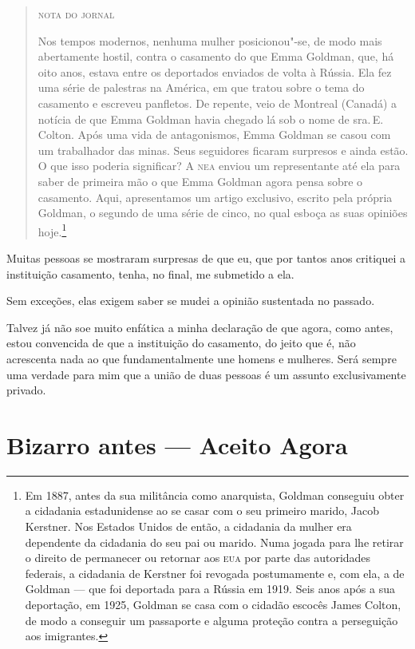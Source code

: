 \begin{quote}
\textsc{nota do jornal}

Nos tempos modernos, nenhuma mulher posicionou"-se, de
modo mais abertamente hostil, contra o casamento do que Emma Goldman,
que, há oito anos, estava entre os deportados enviados de volta à
Rússia. Ela fez uma série de palestras na América, em que tratou sobre o
tema do casamento e escreveu panfletos. De repente, veio de Montreal
(Canadá) a notícia de que Emma Goldman havia chegado lá sob o nome de
sra.\,E.\,Colton. Após uma vida de antagonismos, Emma Goldman se casou com
um trabalhador das minas. Seus seguidores ficaram surpresos e ainda
estão. O que isso poderia significar? A \textsc{nea} enviou um representante até
ela para saber de primeira mão o que Emma Goldman agora pensa sobre o
casamento. Aqui, apresentamos um artigo exclusivo, escrito pela própria
Goldman, o segundo de uma série de cinco, no qual esboça as suas opiniões
hoje.\footnote{Em 1887, antes da sua militância como anarquista, Goldman
  conseguiu obter a cidadania estadunidense ao se casar com o seu
  primeiro marido, Jacob Kerstner. Nos Estados Unidos de então, a
  cidadania da mulher era dependente da cidadania do seu pai ou marido.
  Numa jogada para lhe retirar o direito de permanecer ou retornar aos \textsc{eua}
  por parte das autoridades federais, a cidadania de Kerstner foi revogada
  postumamente e, com ela, a de Goldman --- que foi deportada para a
  Rússia em 1919. Seis anos após a sua deportação, em 1925, Goldman se
  casa com o cidadão escocês James Colton, de modo a conseguir um
  passaporte e alguma proteção contra a perseguição aos imigrantes.}
\end{quote}

\asterisc

Muitas pessoas se mostraram surpresas de que eu, que por tantos anos
critiquei a instituição casamento, tenha, no final, me submetido a ela.

Sem exceções, elas exigem saber se mudei a opinião sustentada no
passado.

Talvez já não soe muito enfática a minha declaração de que agora, como
antes, estou convencida de que a instituição do casamento, do jeito que
é, não acrescenta nada ao que fundamentalmente une homens e mulheres.
Será sempre uma verdade para mim que a união de duas pessoas é um
assunto exclusivamente privado.

\section{Bizarro antes --- Aceito Agora}

